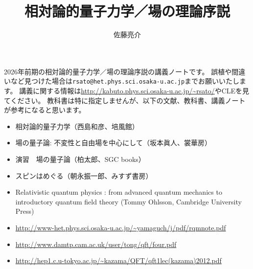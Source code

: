 \documentclass[10pt,a4paper]{jarticle}
\author{佐藤亮介}
\title{相対論的量子力学／場の理論序説}
\begin{document}
\maketitle

2026年前期の相対論的量子力学／場の理論序説の講義ノートです。
誤植や間違いなど見つけた場合は\texttt{rsato@het.phys.sci.osaka-u.ac.jp}までお願いいたします。
講義に関する情報は\url{http://kabuto.phys.sci.osaka-u.ac.jp/~rsato/}やCLEを見てください。
教科書は特に指定しませんが、以下の文献、教科書、講義ノートが参考になると思います。
\begin{itemize}
\item 相対論的量子力学（西島和彦、培風館）
\item 場の量子論: 不変性と自由場を中心にして（坂本眞人、裳華房）
\item 演習　場の量子論（柏太郎、SGC books）
\item スピンはめぐる（朝永振一郎、みすず書房）
\item Relativistic quantum physics : from advanced quantum mechanics to introductory quantum field theory (Tommy Ohlsson, Cambridge University Press)
\item \url{http://www-het.phys.sci.osaka-u.ac.jp/~yamaguch/j/pdf/rqmnote.pdf}
\item \url{http://www.damtp.cam.ac.uk/user/tong/qft/four.pdf}
\item \url{http://hep1.c.u-tokyo.ac.jp/~kazama/QFT/qft1lec(kazama)2012.pdf}
\end{itemize}

\tableofcontents
\setcounter{section}{-1}











\appendix





\end{document}
